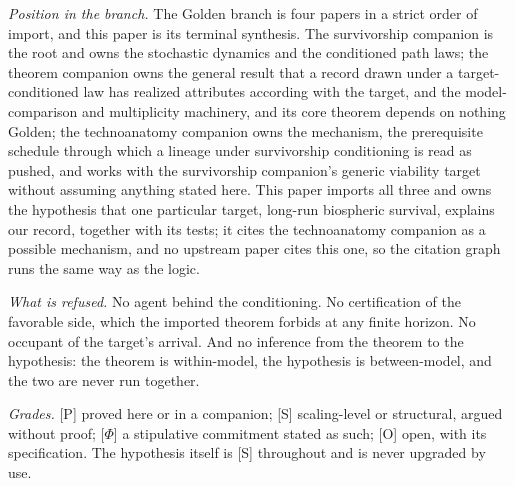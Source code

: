 \emph{Position in the branch.} The Golden branch is four papers in a
strict order of import, and this paper is its terminal synthesis. The
survivorship companion \cite{GoldenSurvivorship} is the root and owns the stochastic
dynamics and the conditioned path laws; the theorem companion
\cite{GoldenTargeted} owns the general result that a record drawn under a
target-conditioned law has realized attributes according with the
target, and the model-comparison and multiplicity machinery, and its
core theorem depends on nothing Golden; the technoanatomy companion
\cite{GoldenTechnoanatomy} owns the mechanism, the prerequisite schedule through
which a lineage under survivorship conditioning is read as pushed, and
works with the survivorship companion's generic viability target
without assuming anything stated here. This paper imports all three and
owns the hypothesis that one particular target, long-run biospheric
survival, explains our record, together with its tests; it cites the
technoanatomy companion as a possible mechanism, and no upstream paper
cites this one, so the citation graph runs the same way as the logic.

\emph{What is refused.} No agent behind the conditioning. No
certification of the favorable side, which the imported theorem forbids
at any finite horizon. No occupant of the target's arrival. And no
inference from the theorem to the hypothesis: the theorem is within-model,
the hypothesis is between-model, and the two are never run together.

\emph{Grades.} [P] proved here or in a companion; [S] scaling-level or
structural, argued without proof; [$\Phi$] a stipulative commitment stated
as such; [O] open, with its specification. The hypothesis itself is [S]
throughout and is never upgraded by use.

